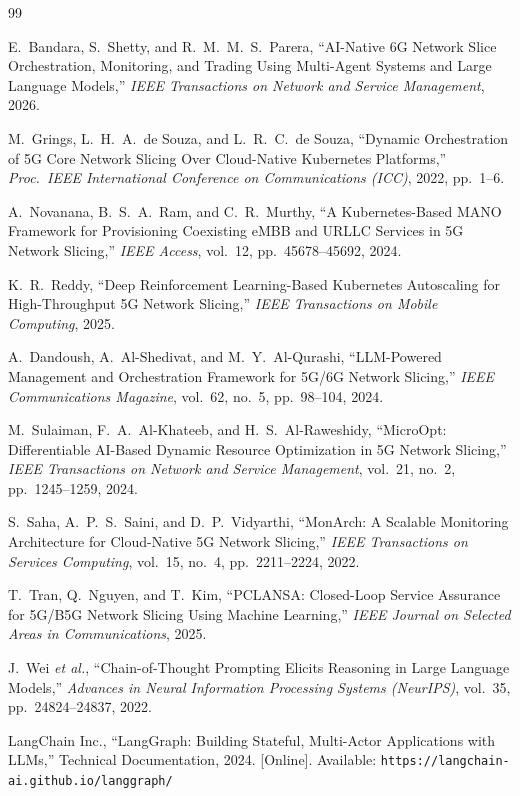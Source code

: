 \begin{thebibliography}{99}

E.\ Bandara, S.\ Shetty, and R.\ M.\ M.\ S.\ Parera, ``AI-Native 6G Network Slice Orchestration, Monitoring, and Trading Using Multi-Agent Systems and Large Language Models,'' \textit{IEEE Transactions on Network and Service Management}, 2026.

M.\ Grings, L.\ H.\ A.\ de Souza, and L.\ R.\ C.\ de Souza, ``Dynamic Orchestration of 5G Core Network Slicing Over Cloud-Native Kubernetes Platforms,'' \textit{Proc.\ IEEE International Conference on Communications (ICC)}, 2022, pp.\ 1--6.

A.\ Novanana, B.\ S.\ A.\ Ram, and C.\ R.\ Murthy, ``A Kubernetes-Based MANO Framework for Provisioning Coexisting eMBB and URLLC Services in 5G Network Slicing,'' \textit{IEEE Access}, vol.\ 12, pp.\ 45678--45692, 2024.

K.\ R.\ Reddy, ``Deep Reinforcement Learning-Based Kubernetes Autoscaling for High-Throughput 5G Network Slicing,'' \textit{IEEE Transactions on Mobile Computing}, 2025.

A.\ Dandoush, A.\ Al-Shedivat, and M.\ Y.\ Al-Qurashi, ``LLM-Powered Management and Orchestration Framework for 5G/6G Network Slicing,'' \textit{IEEE Communications Magazine}, vol.\ 62, no.\ 5, pp.\ 98--104, 2024.

M.\ Sulaiman, F.\ A.\ Al-Khateeb, and H.\ S.\ Al-Raweshidy, ``MicroOpt: Differentiable AI-Based Dynamic Resource Optimization in 5G Network Slicing,'' \textit{IEEE Transactions on Network and Service Management}, vol.\ 21, no.\ 2, pp.\ 1245--1259, 2024.

S.\ Saha, A.\ P.\ S.\ Saini, and D.\ P.\ Vidyarthi, ``MonArch: A Scalable Monitoring Architecture for Cloud-Native 5G Network Slicing,'' \textit{IEEE Transactions on Services Computing}, vol.\ 15, no.\ 4, pp.\ 2211--2224, 2022.

T.\ Tran, Q.\ Nguyen, and T.\ Kim, ``PCLANSA: Closed-Loop Service Assurance for 5G/B5G Network Slicing Using Machine Learning,'' \textit{IEEE Journal on Selected Areas in Communications}, 2025.

J.\ Wei \textit{et al.}, ``Chain-of-Thought Prompting Elicits Reasoning in Large Language Models,'' \textit{Advances in Neural Information Processing Systems (NeurIPS)}, vol.\ 35, pp.\ 24824--24837, 2022.

LangChain Inc., ``LangGraph: Building Stateful, Multi-Actor Applications with LLMs,'' Technical Documentation, 2024. [Online]. Available: \texttt{https://langchain-ai.github.io/langgraph/}

\end{thebibliography}


